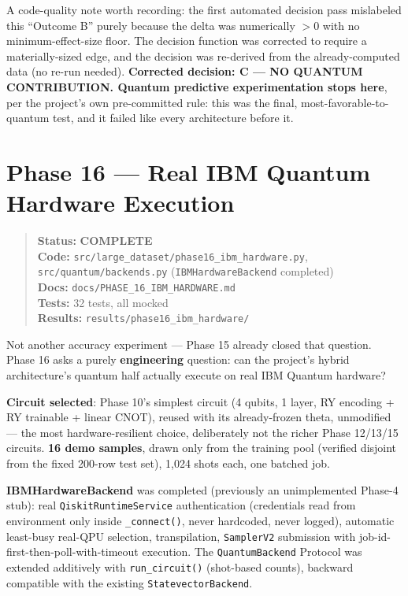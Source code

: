 \documentclass[11pt,a4paper]{article}
\newcommand{\code}[1]{\texttt{\small #1}}
\newcommand{\done}{\textcolor{donecolor}{\textbf{COMPLETE}}}
\newcommand{\phasestatus}[5]{%
\begin{quote}\small\raggedright
\textbf{Status:} #1 \\
\textbf{Code:} #2 \\
\textbf{Docs:} #3 \\
\textbf{Tests:} #4 \\
\textbf{Results:} #5
\end{quote}}
\begin{document}
A code-quality note worth recording: the first automated decision pass mislabeled this ``Outcome B'' purely because the delta was numerically $>0$ with no minimum-effect-size floor. The decision function was corrected to require a materially-sized edge, and the decision was re-derived from the already-computed data (no re-run needed). \textbf{Corrected decision: C --- NO QUANTUM CONTRIBUTION. Quantum predictive experimentation stops here}, per the project's own pre-committed rule: this was the final, most-favorable-to-quantum test, and it failed like every architecture before it.

\section{Phase 16 --- Real IBM Quantum Hardware Execution}
\label{sec:phase16}

\phasestatus{\done}{\code{src/large\_dataset/phase16\_ibm\_hardware.py}, \code{src/quantum/backends.py} (\code{IBMHardwareBackend} completed)}{\code{docs/PHASE\_16\_IBM\_HARDWARE.md}}{32 tests, all mocked}{\code{results/phase16\_ibm\_hardware/}}

Not another accuracy experiment --- Phase 15 already closed that question. Phase 16 asks a purely \textbf{engineering} question: can the project's hybrid architecture's quantum half actually execute on real IBM Quantum hardware?

\textbf{Circuit selected}: Phase 10's simplest circuit (4 qubits, 1 layer, RY encoding + RY trainable + linear CNOT), reused with its already-frozen theta, unmodified --- the most hardware-resilient choice, deliberately not the richer Phase 12/13/15 circuits. \textbf{16 demo samples}, drawn only from the training pool (verified disjoint from the fixed 200-row test set), 1,024 shots each, one batched job.

\textbf{IBMHardwareBackend} was completed (previously an unimplemented Phase-4 stub): real \code{QiskitRuntimeService} authentication (credentials read from environment only inside \code{\_connect()}, never hardcoded, never logged), automatic least-busy real-QPU selection, transpilation, \code{SamplerV2} submission with job-id-first-then-poll-with-timeout execution. The \code{QuantumBackend} Protocol was extended additively with \code{run\_circuit()} (shot-based counts), backward compatible with the existing \code{StatevectorBackend}.
\end{document}
